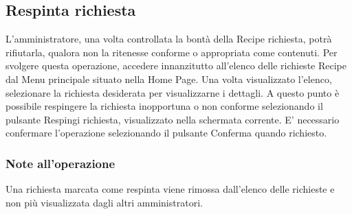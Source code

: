 	\subsection{Respinta richiesta}
	L'amministratore, una volta controllata la bontà della Recipe richiesta, potrà rifiutarla, qualora non la ritenesse conforme o appropriata come contenuti.
	Per svolgere questa operazione, accedere innanzitutto all'elenco delle richieste Recipe dal Menu principale situato nella Home Page.
	Una volta visualizzato l'elenco, selezionare la richiesta desiderata per visualizzarne i dettagli.
	A questo punto è possibile respingere la richiesta inopportuna o non conforme selezionando il pulsante Respingi richiesta, visualizzato nella schermata corrente.
	E' necessario confermare l'operazione selezionando il pulsante Conferma quando richiesto.
	\subsubsection{Note all'operazione}
	Una richiesta marcata come respinta viene rimossa dall'elenco delle richieste e non più visualizzata dagli altri amministratori.
	
